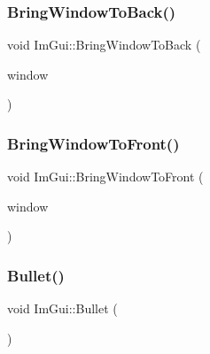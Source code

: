 \hypertarget{namespace_im_gui_aa4205bd07b25655ed023f47b52572273}{}\label{namespace_im_gui_aa4205bd07b25655ed023f47b52572273} 
\subsubsection{\texorpdfstring{Bring\+Window\+To\+Back()}{BringWindowToBack()}}
{\footnotesize\ttfamily void Im\+Gui\+::\+Bring\+Window\+To\+Back (\begin{DoxyParamCaption}\item[{\hyperlink{struct_im_gui_window}{Im\+Gui\+Window} $\ast$}]{window }\end{DoxyParamCaption})}

\hypertarget{namespace_im_gui_a5a4f4151114339422bfff1b2fffd022c}{}\label{namespace_im_gui_a5a4f4151114339422bfff1b2fffd022c} 
\subsubsection{\texorpdfstring{Bring\+Window\+To\+Front()}{BringWindowToFront()}}
{\footnotesize\ttfamily void Im\+Gui\+::\+Bring\+Window\+To\+Front (\begin{DoxyParamCaption}\item[{\hyperlink{struct_im_gui_window}{Im\+Gui\+Window} $\ast$}]{window }\end{DoxyParamCaption})}

\hypertarget{namespace_im_gui_ae2d22212681556d2c2398dfd152f3121}{}\label{namespace_im_gui_ae2d22212681556d2c2398dfd152f3121} 
\subsubsection{\texorpdfstring{Bullet()}{Bullet()}}
{\footnotesize\ttfamily void Im\+Gui\+::\+Bullet (\begin{DoxyParamCaption}{ }\end{DoxyParamCaption})}

\hypertarget{namespace_im_gui_af8d34d563b17c683943a0fa7bf5807bc}{}\label{namespace_im_gui_af8d34d563b17c683943a0fa7bf5807bc} 
